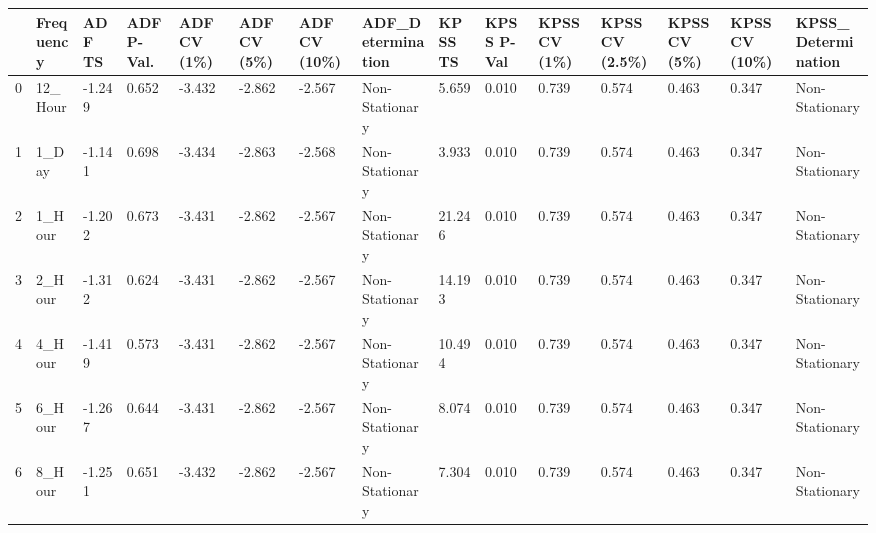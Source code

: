 \begin{tabular}{lllllllllllllll}
\toprule
 & Frequency & ADF TS & ADF P-Val. & ADF CV (1\%) & ADF CV (5\%) & ADF CV (10\%) & ADF_Determination & KPSS TS & KPSS P-Val & KPSS CV (1\%) & KPSS CV (2.5\%) & KPSS CV (5\%) & KPSS CV (10\%) & KPSS_Determination \\
\midrule
0 & 12_Hour & -1.249 & 0.652 & -3.432 & -2.862 & -2.567 & Non-Stationary & 5.659 & 0.010 & 0.739 & 0.574 & 0.463 & 0.347 & Non-Stationary \\
1 & 1_Day & -1.141 & 0.698 & -3.434 & -2.863 & -2.568 & Non-Stationary & 3.933 & 0.010 & 0.739 & 0.574 & 0.463 & 0.347 & Non-Stationary \\
2 & 1_Hour & -1.202 & 0.673 & -3.431 & -2.862 & -2.567 & Non-Stationary & 21.246 & 0.010 & 0.739 & 0.574 & 0.463 & 0.347 & Non-Stationary \\
3 & 2_Hour & -1.312 & 0.624 & -3.431 & -2.862 & -2.567 & Non-Stationary & 14.193 & 0.010 & 0.739 & 0.574 & 0.463 & 0.347 & Non-Stationary \\
4 & 4_Hour & -1.419 & 0.573 & -3.431 & -2.862 & -2.567 & Non-Stationary & 10.494 & 0.010 & 0.739 & 0.574 & 0.463 & 0.347 & Non-Stationary \\
5 & 6_Hour & -1.267 & 0.644 & -3.431 & -2.862 & -2.567 & Non-Stationary & 8.074 & 0.010 & 0.739 & 0.574 & 0.463 & 0.347 & Non-Stationary \\
6 & 8_Hour & -1.251 & 0.651 & -3.432 & -2.862 & -2.567 & Non-Stationary & 7.304 & 0.010 & 0.739 & 0.574 & 0.463 & 0.347 & Non-Stationary \\
\bottomrule
\end{tabular}
